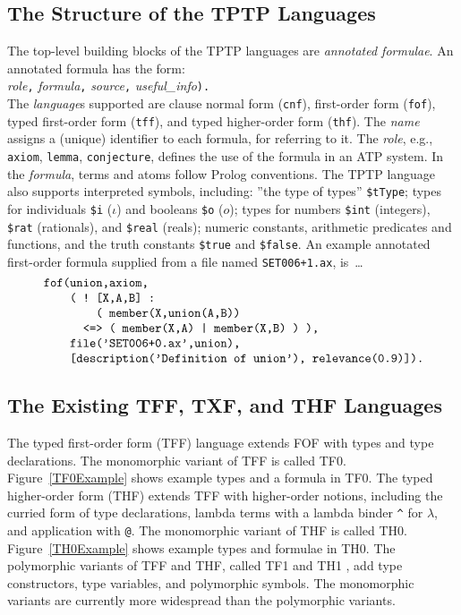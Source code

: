 \documentclass[runningheads]{llncs}
\begin{document}
\subsection{The Structure of the TPTP Languages}
\label{Structure}

The top-level building blocks of the TPTP languages are {\em annotated formulae}.
An annotated formula has the form:\\
 {\em role}{\tt ,} {\em formula}{\tt ,} 
{\em source}{\tt ,} {\em useful\_info}{\tt ).} \\ 
The {\em language}s supported are clause normal form ({\tt cnf}), first-order form ({\tt fof}), 
typed first-order form ({\tt tff}), and typed higher-order form ({\tt thf}).
The {\em name} assigns a (unique) identifier to each formula, for referring to it.
The {\em role}, e.g., {\tt axiom}, {\tt lemma}, {\tt conjecture}, defines the use of the formula 
in an ATP system.
In the {\em formula}, terms and atoms follow Prolog conventions.
The TPTP language also supports interpreted symbols, including: 
''the type of types'' {\tt \$tType};
types for individuals {\tt \$i} ($\iota$) and booleans {\tt \$o} ($o$);
types for numbers {\tt \$int} (integers), {\tt \$rat} (rationals), and {\tt \$real} (reals);
numeric constants,
arithmetic predicates and functions,
and
the truth constants {\tt \$true} and {\tt \$false}.
An example annotated first-order formula supplied from a file named {\tt SET006+1.ax}, is~\ldots
\[
\begin{minipage}{\textwidth}
\begin{verbatim}
    fof(union,axiom,
        ( ! [X,A,B] :
            ( member(X,union(A,B))
          <=> ( member(X,A) | member(X,B) ) ),
        file('SET006+0.ax',union),
        [description('Definition of union'), relevance(0.9)]).
\end{verbatim}
\end{minipage}
\]

\subsection{The Existing TFF, TXF, and THF Languages}
\label{TFFTXFTHF}

The typed first-order form (TFF) language extends FOF with types and type declarations.
The monomorphic variant of TFF is called TF0.
Figure~\ref{TF0Example} shows example types and a formula in TF0.
The typed higher-order form (THF) extends TFF with higher-order notions, including the
curried form of type declarations, lambda terms with a lambda 
binder {\tt \verb|^|} for $\lambda$, and application with {\tt @}.
The monomorphic variant of THF is called TH0.
Figure~\ref{TH0Example} shows example types and formulae in TH0.
The polymorphic variants of TFF and THF, called TF1 \cite{BP13-TFF1} and TH1 \cite{KSR16},
add type constructors, type variables, and polymorphic symbols.
The monomorphic variants are currently more widespread than the polymorphic variants.
\end{document}
